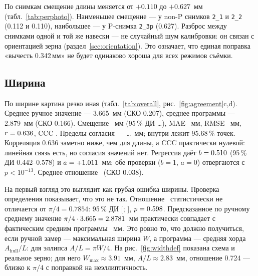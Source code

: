\documentclass[12pt,a4paper]{article}
\begin{document}
\begin{table}[htbp]
\centering\scriptsize
\setlength{\tabcolsep}{3pt}
\caption{Робастные метрики согласия (выбросы не удалены; чистые значения —
после исключения точек с $|z| > 3.5$).}
\label{tab:robust}

\end{table}

По снимкам смещение длины меняется от $+\num{0.110}$ до
$+\num{0.627}$~мм (табл.~\ref{tab:perphoto}). Наименьшее смещение —
у non-P снимков \texttt{2\_1} и \texttt{2\_2} (\num{+0.112} и
\num{+0.110}), наибольшее — у P-снимка \texttt{2\_3p} (\num{+0.627}).
Разброс между снимками одной и той же навески — не случайный шум
калибровки: он связан с ориентацией зерна (раздел~\ref{sec:orientation}).
Это означает, что единая поправка «вычесть \num{0.342}\,мм» не будет
одинаково хороша для всех режимов съёмки.

\begin{table}[htbp]
\centering\scriptsize
\caption{Согласие по отдельным снимкам (каждый снимок сравнивается с
ручными значениями независимо; $n = 324$).}
\label{tab:perphoto}

\end{table}

\subsection{Ширина}

По ширине картина резко иная (табл.~\ref{tab:overall},
рис.~\ref{fig:agreement}c,d). Среднее ручное значение — \num{3.665}~мм
(СКО \num{0.207}), среднее программы — \num{2.879}~мм (СКО \num{0.166}).
Смещение \WidBias~мм (95\,\% ДИ \WidBiasLo\ldots\WidBiasHi), MAE
\WidMae~мм, RMSE \WidRmse~мм, $r = \num{0.636}$, CCC \WidCcc. Пределы
согласия — \WidLoaLo\ldots\WidLoaHi~мм; внутри лежит \num{95.68}\,\%
точек. Корреляция \num{0.636} заметно ниже, чем для длины, а CCC
практически нулевой: линейная связь есть, но согласия значений нет.
Регрессия даёт $b = \num{0.510}$ (95\,\% ДИ \num{0.442}--\num{0.578}) и
$a = +\num{1.011}$~мм; обе проверки ($b=1$, $a=0$) отвергаются с
$p < 10^{-13}$. Среднее отношение \WidRatio\ (СКО \num{0.038}).

На первый взгляд это выглядит как грубая ошибка ширины. Проверка
определения показывает, что это не так. Отношение \WidRatio\
статистически не отличается от $\pi/4 = \num{0.7854}$: 95\,\% ДИ
[\RatioLo; \RatioHi], $p = \num{0.598}$. Предсказанное по ручному среднему
значение $\pi/4 \cdot \num{3.665} = \num{2.8781}$~мм практически совпадает
с фактическим средним программы \PiActual~мм. Это ровно то, что должно
получиться, если ручной замер — максимальная ширина $W$, а программа —
средняя хорда $A_{\text{hull}}/L$: для эллипса $A/L = \pi W/4$. На
рис.~\ref{fig:widthdef} показана схема и реальное зерно; для него
$W_{\max} \approx \num{3.91}$~мм, $A/L \approx \num{2.83}$~мм,
отношение \num{0.724} — близко к $\pi/4$ с поправкой на неэллиптичность.
\end{document}
